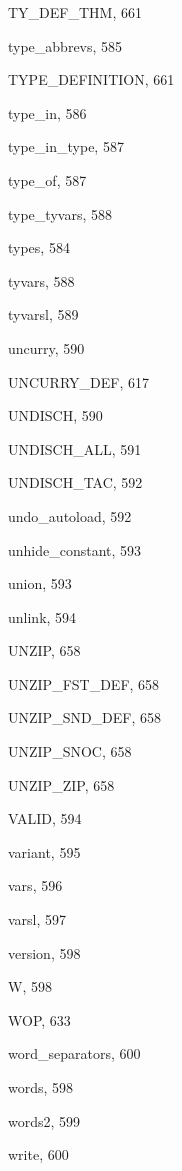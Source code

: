 \begin{theindex}
  \item {\ptt TY\_DEF\_THM}, 661
  \item {\ptt type\_abbrevs}, 585
  \item {\ptt TYPE\_DEFINITION}, 661
  \item {\ptt type\_in}, 586
  \item {\ptt type\_in\_type}, 587
  \item {\ptt type\_of}, 587
  \item {\ptt type\_tyvars}, 588
  \item {\ptt types}, 584
  \item {\ptt tyvars}, 588
  \item {\ptt tyvarsl}, 589

  \indexspace

  \item {\ptt uncurry}, 590
  \item {\ptt UNCURRY\_DEF}, 617
  \item {\ptt UNDISCH}, 590
  \item {\ptt UNDISCH\_ALL}, 591
  \item {\ptt UNDISCH\_TAC}, 592
  \item {\ptt undo\_autoload}, 592
  \item {\ptt unhide\_constant}, 593
  \item {\ptt union}, 593
  \item {\ptt unlink}, 594
  \item {\ptt UNZIP}, 658
  \item {\ptt UNZIP\_FST\_DEF}, 658
  \item {\ptt UNZIP\_SND\_DEF}, 658
  \item {\ptt UNZIP\_SNOC}, 658
  \item {\ptt UNZIP\_ZIP}, 658

  \indexspace

  \item {\ptt VALID}, 594
  \item {\ptt variant}, 595
  \item {\ptt vars}, 596
  \item {\ptt varsl}, 597
  \item {\ptt version}, 598

  \indexspace

  \item {\ptt W}, 598
  \item {\ptt WOP}, 633
  \item {\ptt word\_separators}, 600
  \item {\ptt words}, 598
  \item {\ptt words2}, 599
  \item {\ptt write}, 600


\end{theindex}
